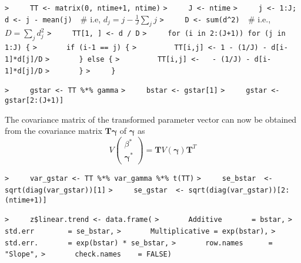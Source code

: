 \documentclass[a4paper]{article}
\begin{document}
\verb~>     TT <- matrix(0, ntime+1, ntime)~\newline
\verb~>     J <- ntime~\newline
\verb~>     j <- 1:J; d <- j - mean(j)  ~{\sffamily\# i.e, $ d_j = j-\frac{1}{J}\sum_j j$}\newline
\verb~>     D <- sum(d^2)  ~{\sffamily\# i.e., $ D = \sum_j d_j^2$}\newline
\verb~>     TT[1, ] <- d / D~\newline
\verb~>     for (i in 2:(J+1)) for (j in 1:J) {~\newline
\verb~>       if (i-1 == j) {~\newline
\verb~>         TT[i,j] <- 1 - (1/J) - d[i-1]*d[j]/D~\newline
\verb~>       } else {~\newline
\verb~>         TT[i,j] <-   - (1/J) - d[i-1]*d[j]/D~\newline
\verb~>       }~\newline
\verb~>     }~\par

\verb~>     gstar <- TT %*% gamma~\newline
\verb~>     bstar <- gstar[1]~\newline
\verb~>     gstar <- gstar[2:(J+1)]~\par

The covariance matrix of the transformed parameter vector can now be obtained
from the covariance matrix $\mathbf{T}\boldsymbol{\gamma}$ of $\boldsymbol{\gamma}$ as
\begin{equation}
  V\left( \begin{array} {c} \beta^* \\\boldsymbol{\gamma}^* \end{array} \right)
  = \mathbf{T}V(\boldsymbol{\gamma})\mathbf{T}^T
\end{equation}\par

\verb~>     var_gstar <- TT %*% var_gamma %*% t(TT)~\newline
\verb~>     se_bstar  <- sqrt(diag(var_gstar))[1]~\newline
\verb~>     se_gstar  <- sqrt(diag(var_gstar))[2:(ntime+1)]~\par

\verb~>     z$linear.trend <- data.frame(~\newline
\verb~>       Additive       = bstar,~\newline
\verb~>       std.err        = se_bstar,~\newline
\verb~>       Multiplicative = exp(bstar),~\newline
\verb~>       std.err.       = exp(bstar) * se_bstar,~\newline
\verb~>       row.names      = "Slope",~\newline
\verb~>       check.names    = FALSE)~\par
\end{document}
